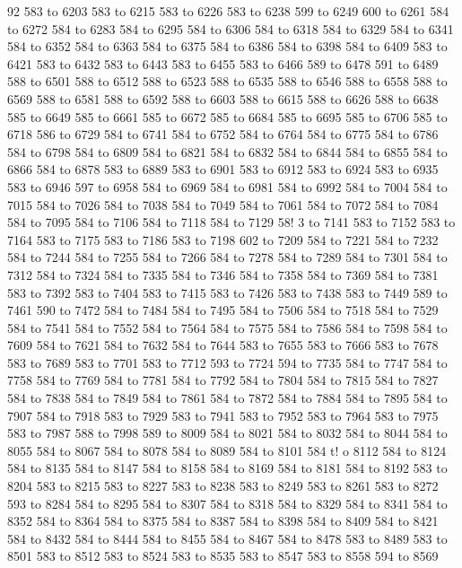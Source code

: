 92 583 to 6203 583 to 6215 583 to 6226 583 to 6238 599 to 6249 600 to 6261 584 to 6272 584 to 6283 584 to 6295 584 to 6306 584 to 6318 584 to 6329 584 to 6341 584 to 6352 584 to 6363 584 to 6375 584 to 6386 584 to 6398 584 to 6409 583 to 6421 583 to 6432 583 to 6443 583 to 6455 583 to 6466 589 to 6478 591 to 6489 588 to 6501 588 to 6512 588 to 6523 588 to 6535 588 to 6546 588 to 6558 588 to 6569 588 to 6581 588 to 6592 588 to 6603 588 to 6615 588 to 6626 588 to 6638 585 to 6649 585 to 6661 585 to 6672 585 to 6684 585 to 6695 585 to 6706 585 to 6718 586 to 6729 584 to 6741 584 to 6752 584 to 6764 584 to 6775 584 to 6786 584 to 6798 584 to 6809 584 to 6821 584 to 6832 584 to 6844 584 to 6855 584 to 6866 584 to 6878 583 to 6889 583 to 6901 583 to 6912 583 to 6924 583 to 6935 583 to 6946 597 to 6958 584 to 6969 584 to 6981 584 to 6992 584 to 7004 584 to 7015 584 to 7026 584 to 7038 584 to 7049 584 to 7061 584 to 7072 584 to 7084 584 to 7095 584 to 7106 584 to 7118 584 to 7129 58!
3 to 7141 583 to 7152 583 to 7164 
583 to 7175 583 to 7186 583 to 7198 602 to 7209 584 to 7221 584 to 7232 584 to 7244 584 to 7255 584 to 7266 584 to 7278 584 to 7289 584 to 7301 584 to 7312 584 to 7324 584 to 7335 584 to 7346 584 to 7358 584 to 7369 584 to 7381 583 to 7392 583 to 7404 583 to 7415 583 to 7426 583 to 7438 583 to 7449 589 to 7461 590 to 7472 584 to 7484 584 to 7495 584 to 7506 584 to 7518 584 to 7529 584 to 7541 584 to 7552 584 to 7564 584 to 7575 584 to 7586 584 to 7598 584 to 7609 584 to 7621 584 to 7632 584 to 7644 583 to 7655 583 to 7666 583 to 7678 583 to 7689 583 to 7701 583 to 7712 593 to 7724 594 to 7735 584 to 7747 584 to 7758 584 to 7769 584 to 7781 584 to 7792 584 to 7804 584 to 7815 584 to 7827 584 to 7838 584 to 7849 584 to 7861 584 to 7872 584 to 7884 584 to 7895 584 to 7907 584 to 7918 583 to 7929 583 to 7941 583 to 7952 583 to 7964 583 to 7975 583 to 7987 588 to 7998 589 to 8009 584 to 8021 584 to 8032 584 to 8044 584 to 8055 584 to 8067 584 to 8078 584 to 8089 584 to 8101 584 t!
o 8112 584 to 8124 584 to 8135 584
 to 8147 584 to 8158 584 to 8169 584 to 8181 584 to 8192 583 to 8204 583 to 8215 583 to 8227 583 to 8238 583 to 8249 583 to 8261 583 to 8272 593 to 8284 584 to 8295 584 to 8307 584 to 8318 584 to 8329 584 to 8341 584 to 8352 584 to 8364 584 to 8375 584 to 8387 584 to 8398 584 to 8409 584 to 8421 584 to 8432 584 to 8444 584 to 8455 584 to 8467 584 to 8478 583 to 8489 583 to 8501 583 to 8512 583 to 8524 583 to 8535 583 to 8547 583 to 8558 594 to 8569 

